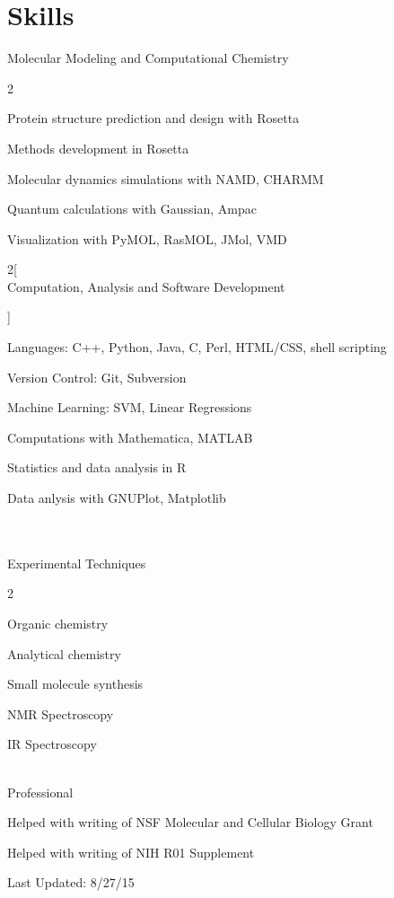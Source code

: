 \documentclass[12pt]{article}
\newcommand{\allcapsspacing}[1]{{\addfontfeature{LetterSpace=7.5}#1}}
\newcommand{\skillsitem}[1]{
\noindent 
#1\vspace{0.25\baselineskip}\par}
\begin{document}
\section*{\allcapsspacing{Skills}}

\skillsitem{Molecular Modeling and Computational Chemistry}
\begin{multicols}{2}
\begin{compactitem}
\item Protein structure prediction and design with Rosetta
\item Methods development in Rosetta 
\item Molecular dynamics simulations with NAMD, CHARMM
\item Quantum calculations with Gaussian, Ampac
\item Visualization with PyMOL, RasMOL, JMol, VMD
\end{compactitem}
\end{multicols}

\begin{multicols}{2}[\skillsitem{\\Computation, Analysis and Software Development}]
\begin{compactitem}
\item Languages: C++, Python, Java, C, Perl, HTML/CSS, shell scripting
\item Version Control: Git, Subversion 
\item Machine Learning: SVM, Linear Regressions
\item Computations with Mathematica, MATLAB
\item Statistics and data analysis in R
\item Data anlysis with GNUPlot, Matplotlib 
\end{compactitem} 
\end{multicols}

\skillsitem{\\\\Experimental Techniques} 
\begin{multicols}{2}
\begin{compactitem}
\item Organic chemistry
\item Analytical chemistry
\item Small molecule synthesis
\item NMR Spectroscopy
\item IR Spectroscopy
\end{compactitem}
\end{multicols}

\skillsitem{\\Professional}
\begin{compactitem}
\item Helped with writing of NSF Molecular and Cellular Biology Grant
\item Helped with writing of NIH R01 Supplement \\
\end{compactitem}

Last Updated: 8/27/15
\end{document}
